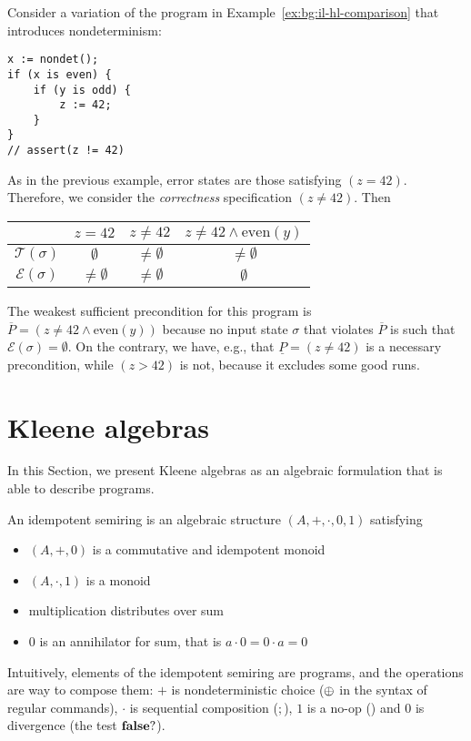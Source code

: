 \begin{example}\label{ex:nc-running}
	Consider a variation of the program in Example~\ref{ex:bg:il-hl-comparison} that introduces nondeterminism:
	\begin{verbatim}
x := nondet();
if (x is even) {
    if (y is odd) {
        z := 42;
    }
}
// assert(z != 42)
	\end{verbatim}
	As in the previous example, error states are those satisfying $(z = 42)$. Therefore, we consider the \emph{correctness} specification $(z \neq 42)$. Then
	\begin{center}
		\begin{tabular}{c|ccc}
			                      & $z = 42$         & $z \neq 42$      & $z \neq 42 \land \text{even}(y)$ \\
			\hline
			$\mathcal{T}(\sigma)$ & $\emptyset$      & $\neq \emptyset$ & $\neq \emptyset$                 \\
			$\mathcal{E}(\sigma)$ & $\neq \emptyset$ & $\neq \emptyset$ & $\emptyset$                      \\
		\end{tabular}
	\end{center}
	The weakest sufficient precondition for this program is $\overline{P} = (z\neq 42 \wedge \text{even}(y))$ because no input state $\sigma$ that violates $\overline{P}$ is such that $\mathcal{E}(\sigma) = \emptyset$.
	On the contrary, we have, e.g., that $\underline{P}= (z\neq 42)$ is a necessary precondition, while $(z > 42)$ is not, because it excludes some good runs.
\end{example}

\section{Kleene algebras}\label{sec:bg:algebra}
In this Section, we present Kleene algebras as an algebraic formulation that is able to describe programs.

\begin{definition}\label{def:bg:i-semiring}
	An idempotent semiring is an algebraic structure $(A, +, \cdot, 0, 1)$ satisfying
	\begin{itemize}
		\item $(A, +, 0)$ is a commutative and idempotent monoid
		\item $(A, \cdot, 1)$ is a monoid
		\item multiplication distributes over sum
		\item $0$ is an annihilator for sum, that is $a \cdot 0 = 0 \cdot a = 0$
	\end{itemize}
\end{definition}
Intuitively, elements of the idempotent semiring are programs, and the operations are way to compose them: $+$ is nondeterministic choice ($\oplus$ in the syntax of regular commands), $\cdot$ is sequential composition ($;$), $1$ is a no-op () and $0$ is divergence (the test $\textbf{false} ?$).

